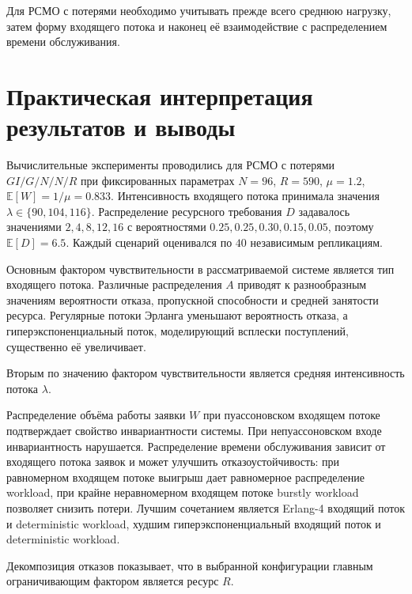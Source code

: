 Для РСМО с потерями необходимо учитывать прежде всего среднюю нагрузку, затем форму входящего потока и наконец её взаимодействие с распределением времени обслуживания.


\section{Практическая интерпретация результатов и выводы}
\label{sec:practical_interpretation}

%

Вычислительные эксперименты проводились для РСМО с потерями $GI/G/N/N/R$ при фиксированных параметрах $N=96$, $R=590$, $\mu=1.2$, $\mathbb{E}[W]=1/\mu=0.833$. Интенсивность входящего потока принимала значения $\lambda \in \{90,104,116\}$. Распределение ресурсного требования $D$ задавалось значениями $2,4,8,12,16$ с вероятностями $0.25,0.25,0.30,0.15,0.05$, поэтому $\mathbb{E}[D]=6.5$. Каждый сценарий оценивался по $40$ независимым репликациям.

Основным фактором чувствительности в рассматриваемой системе является тип входящего потока. Различные распределения $A$ приводят к разнообразным значениям вероятности отказа, пропускной способности и средней занятости ресурса. Регулярные потоки Эрланга уменьшают вероятность отказа, а гиперэкспоненциальный поток, моделирующий всплески поступлений, существенно её увеличивает.

Вторым по значению фактором чувствительности является средняя интенсивность потока $\lambda$. 

Распределение объёма работы заявки $W$ при пуассоновском входящем потоке подтверждает свойство инвариантности системы. При непуассоновском входе инвариантность нарушается. Распределение времени обслуживания зависит от входящего потока заявок и может улучшить отказоустойчивость: при равномерном входящем потоке выигрыш дает равномерное распределение workload, при крайне неравномерном входящем потоке burstly workload позволяет снизить потери. Лучшим сочетанием является Erlang-4 входящий поток и deterministic workload, худшим гиперэкспоненциальный входящий поток и deterministic workload.

Декомпозиция отказов показывает, что в выбранной конфигурации главным ограничивающим фактором является ресурс $R$.
